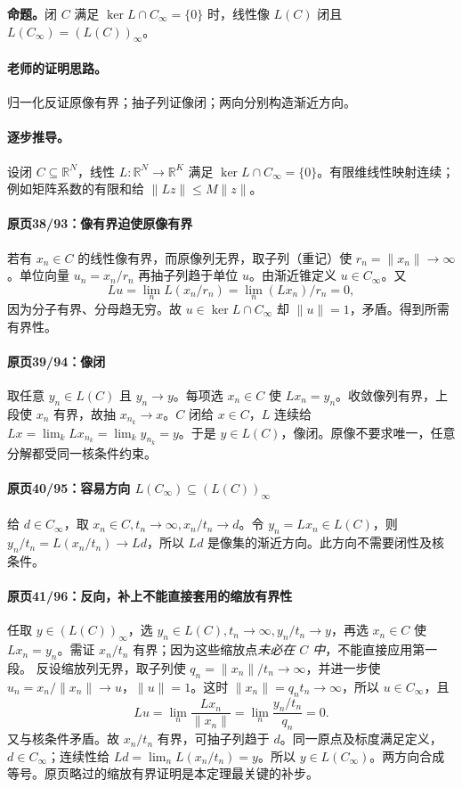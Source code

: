\documentclass[11pt,a4paper]{article}
\newcommand{\R}{\mathbb{R}}\newcommand{\N}{\mathbb{N}}
\theoremstyle{definition}\newtheorem{definition}{定义}\newtheorem{example}{例}
\begin{document}
\textbf{命题。}闭 $C$ 满足 $\ker L\cap C_\infty=\{0\}$ 时，线性像 $L(C)$ 闭且 $L(C_\infty)=(L(C))_\infty$。

\paragraph{老师的证明思路。}归一化反证原像有界；抽子列证像闭；两向分别构造渐近方向。

\paragraph{逐步推导。}
设闭 $C\subseteq\R^N$，线性 $L:\R^N\to\R^K$ 满足 $\ker L\cap C_\infty=\{0\}$。有限维线性映射连续；例如矩阵系数的有限和给 $\|Lz\|\le M\|z\|$。
\paragraph{原页38/93：像有界迫使原像有界}
若有 $x_n\in C$ 的线性像有界，而原像列无界，取子列（重记）使 $r_n=\|x_n\|\to\infty$。单位向量 $u_n=x_n/r_n$ 再抽子列趋于单位 $u$。由渐近锥定义 $u\in C_\infty$。又
\[Lu=\lim_n L(x_n/r_n)=\lim_n(Lx_n)/r_n=0,\]
因为分子有界、分母趋无穷。故 $u\in\ker L\cap C_\infty$ 却 $\|u\|=1$，矛盾。得到所需有界性。
\paragraph{原页39/94：像闭}
取任意 $y_n\in L(C)$ 且 $y_n\to y$。每项选 $x_n\in C$ 使 $Lx_n=y_n$。收敛像列有界，上段使 $x_n$ 有界，故抽 $x_{n_k}\to x$。$C$ 闭给 $x\in C$，$L$ 连续给 $Lx=\lim_kLx_{n_k}=\lim_ky_{n_k}=y$。于是 $y\in L(C)$，像闭。原像不要求唯一，任意分解都受同一核条件约束。
\paragraph{原页40/95：容易方向 $L(C_\infty)\subseteq(L(C))_\infty$}
给 $d\in C_\infty$，取 $x_n\in C,t_n\to\infty,x_n/t_n\to d$。令 $y_n=Lx_n\in L(C)$，则 $y_n/t_n=L(x_n/t_n)\to Ld$，所以 $Ld$ 是像集的渐近方向。此方向不需要闭性及核条件。
\paragraph{原页41/96：反向，补上不能直接套用的缩放有界性}
任取 $y\in(L(C))_\infty$，选 $y_n\in L(C),t_n\to\infty,y_n/t_n\to y$，再选 $x_n\in C$ 使 $Lx_n=y_n$。需证 $x_n/t_n$ 有界；因为这些缩放点\emph{未必在 $C$ 中}，不能直接应用第一段。
反设缩放列无界，取子列使 $q_n=\|x_n\|/t_n\to\infty$，并进一步使 $u_n=x_n/\|x_n\|\to u$，$\|u\|=1$。这时 $\|x_n\|=q_nt_n\to\infty$，所以 $u\in C_\infty$，且
\[Lu=\lim_n\frac{Lx_n}{\|x_n\|}=\lim_n\frac{y_n/t_n}{q_n}=0.\]
又与核条件矛盾。故 $x_n/t_n$ 有界，可抽子列趋于 $d$。同一原点及标度满足定义，$d\in C_\infty$；连续性给 $Ld=\lim_nL(x_n/t_n)=y$。所以 $y\in L(C_\infty)$。两方向合成等号。原页略过的缩放有界证明是本定理最关键的补步。
\end{document}
